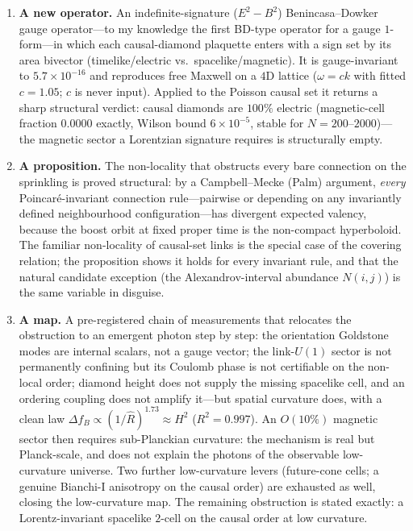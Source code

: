 \documentclass[11pt]{article}
\begin{document}
\begin{enumerate}[leftmargin=1.6em]
\item \textbf{A new operator.} An indefinite-signature ($E^2-B^2$)
Benincasa--Dowker gauge operator---to my knowledge the first BD-type operator for
a gauge $1$-form---in which each causal-diamond plaquette enters with a sign set
by its area bivector (timelike/electric vs.\ spacelike/magnetic). It is
gauge-invariant to $5.7\times10^{-16}$ and reproduces free Maxwell on a $4$D
lattice ($\omega=ck$ with fitted $c=1.05$; $c$ is never input). Applied to the
Poisson causal set it returns a sharp structural verdict: causal diamonds are
$100\%$ electric (magnetic-cell fraction $0.0000$ exactly, Wilson bound
$6\times10^{-5}$, stable for $N=200$--$2000$)---the magnetic sector a Lorentzian
signature requires is structurally empty.

\item \textbf{A proposition.} The non-locality that obstructs every bare
connection on the sprinkling is proved structural: by a Campbell--Mecke (Palm)
argument, \emph{every} Poincar\'e-invariant connection rule---pairwise or
depending on any invariantly defined neighbourhood configuration---has divergent
expected valency, because the boost orbit at fixed proper time is the non-compact
hyperboloid. The familiar non-locality of causal-set links is the special case of
the covering relation; the proposition shows it holds for every invariant rule,
and that the natural candidate exception (the Alexandrov-interval abundance
$N(i,j)$) is the same variable in disguise.

\item \textbf{A map.} A pre-registered chain of measurements that relocates the
obstruction to an emergent photon step by step: the orientation Goldstone modes
are internal scalars, not a gauge vector; the link-$U(1)$ sector is not
permanently confining but its Coulomb phase is not certifiable on the non-local
order; diamond height does not supply the missing spacelike cell, and an ordering
coupling does not amplify it---but spatial curvature does, with a clean law
$\Delta f_B\propto(1/\hat R)^{1.73}\approx H^2$ ($R^2=0.997$). An $O(10\%)$
magnetic sector then requires sub-Planckian curvature: the mechanism is real but
Planck-scale, and does not explain the photons of the observable low-curvature
universe. Two further low-curvature levers (future-cone cells; a genuine
Bianchi-I anisotropy on the causal order) are exhausted as well, closing the
low-curvature map. The remaining obstruction is stated exactly: a
Lorentz-invariant spacelike $2$-cell on the causal order at low curvature.
\end{enumerate}
\end{document}
